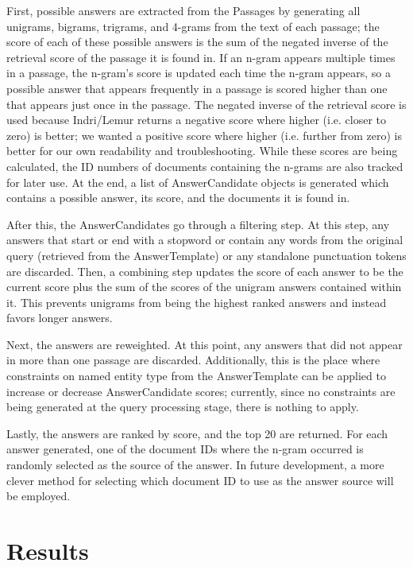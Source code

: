 \documentclass[11pt]{article}
\begin{document}
First, possible answers are extracted from the Passages by generating all unigrams, bigrams, trigrams, and 4-grams from the text of each passage; the score of each of these possible answers is the sum of the negated inverse of the retrieval score of the passage it is found in.  If an n-gram appears multiple times in a passage, the n-gram's score is updated each time the n-gram appears, so a possible answer that appears frequently in a passage is scored higher than one that appears just once in the passage.  The negated inverse of the retrieval score is used because Indri/Lemur returns a negative score where higher (i.e. closer to zero) is better; we wanted a positive score where higher (i.e. further from zero) is better for our own readability and troubleshooting.  While these scores are being calculated, the ID numbers of documents containing the n-grams are also tracked for later use.  At the end, a list of AnswerCandidate objects is generated which contains a possible answer, its score, and the documents it is found in.

After this, the AnswerCandidates go through a filtering step.  At this step, any answers that start or end with a stopword or contain any words from the original query (retrieved from the AnswerTemplate) or any standalone punctuation tokens are discarded.  Then, a combining step updates the score of each answer to be the current score plus the sum of the scores of the unigram answers contained within it. This prevents unigrams from being the highest ranked answers and instead favors longer answers.

Next, the answers are reweighted.  At this point, any answers that did not appear in more than one passage are discarded.  Additionally, this is the place where constraints on named entity type from the AnswerTemplate can be applied to increase or decrease AnswerCandidate scores; currently, since no constraints are being generated at the query processing stage, there is nothing to apply.

Lastly, the answers are ranked by score, and the top 20 are returned.  For each answer generated, one of the document IDs where the n-gram occurred is randomly selected as the source of the answer.  In future development, a more clever method for selecting which document ID to use as the answer source will be employed.

\section{Results}
\end{document}
